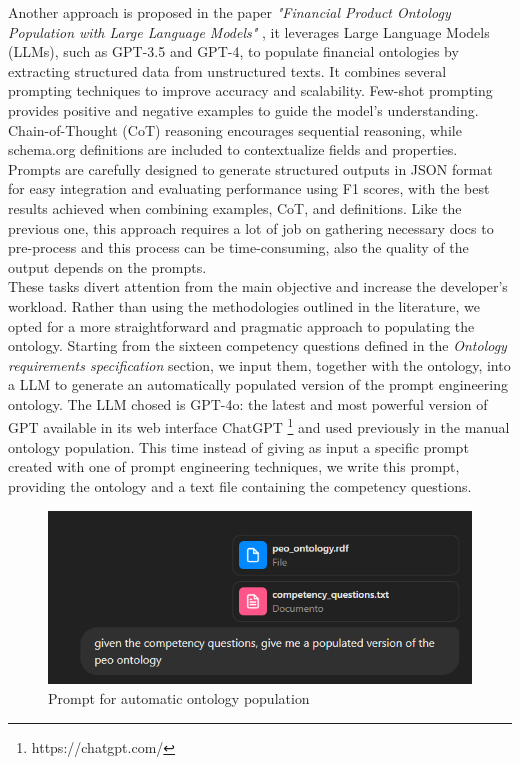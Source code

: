 Another approach is proposed in the paper \textit{"Financial Product Ontology Population with Large Language Models"} \cite{saetia2024financial}, it leverages Large Language Models (LLMs), such as GPT-3.5 and GPT-4, to populate financial ontologies by extracting structured data from unstructured texts. It combines several prompting techniques to improve accuracy and scalability. Few-shot prompting provides positive and negative examples to guide the model's understanding. Chain-of-Thought (CoT) reasoning encourages sequential reasoning, while schema.org definitions are included to contextualize fields and properties. Prompts are carefully designed to generate structured outputs in JSON format for easy integration and evaluating performance using F1 scores, with the best results achieved when combining examples, CoT, and definitions. Like the previous one, this approach requires a lot of job on gathering necessary docs to pre-process and this process can be time-consuming, also the quality of the output depends on the prompts.\\ These tasks divert attention from the main objective and increase the developer's workload. Rather than using the methodologies outlined in the literature, we opted for a more straightforward and pragmatic approach to populating the ontology. Starting from the sixteen competency questions defined in the \textit{Ontology requirements specification} section, we input them, together with the ontology, into a LLM to generate an automatically populated version of the prompt engineering ontology. The LLM chosed is GPT-4o: the latest and most powerful version of GPT available in its web interface ChatGPT \footnote{https://chatgpt.com/} and used previously in the manual ontology population. This time instead of giving as input a specific prompt created with one of prompt engineering techniques, we write this prompt, providing the ontology and a text file containing the competency questions.
\begin{figure}[H]
    \centering
    \includegraphics[width=0.9\linewidth]{Figures/fig_34.png}
    \caption{Prompt for automatic ontology population}
    \label{fig:34}
\end{figure}
